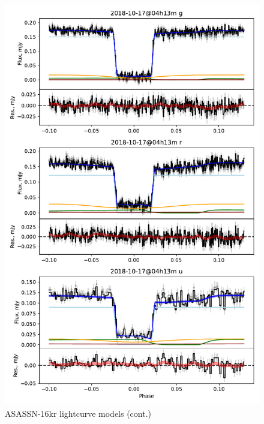 \begin{figure}
    \centering
    \includegraphics[width=\textwidth]{figures/results/three_cvs_with_weird_colours/ASASSN-16kr/ASASSN-16kr_4.pdf}
    \caption{ASASSN-16kr lightcurve models (cont.)}
    \label{fig:ASASSN-16kr all lightcurves cont 3}
\end{figure}
